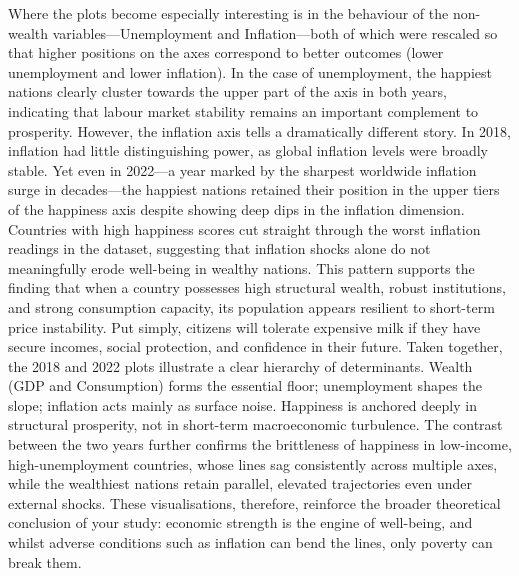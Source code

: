 \documentclass[conference]{IEEEtran}
\begin{document}
Where the plots become especially interesting is in the behaviour of the non-wealth variables—Unemployment and Inflation—both of which were rescaled so that higher positions on the axes correspond to better outcomes (lower unemployment and lower inflation). In the case of unemployment, the happiest nations clearly cluster towards the upper part of the axis in both years, indicating that labour market stability remains an important complement to prosperity. However, the inflation axis tells a dramatically different story. In 2018, inflation had little distinguishing power, as global inflation levels were broadly stable. Yet even in 2022—a year marked by the sharpest worldwide inflation surge in decades—the happiest nations retained their position in the upper tiers of the happiness axis despite showing deep dips in the inflation dimension. Countries with high happiness scores cut straight through the worst inflation readings in the dataset, suggesting that inflation shocks alone do not meaningfully erode well-being in wealthy nations. This pattern supports the finding that when a country possesses high structural wealth, robust institutions, and strong consumption capacity, its population appears resilient to short-term price instability. Put simply, citizens will tolerate expensive milk if they have secure incomes, social protection, and confidence in their future.
Taken together, the 2018 and 2022 plots illustrate a clear hierarchy of determinants. Wealth (GDP and Consumption) forms the essential floor; unemployment shapes the slope; inflation acts mainly as surface noise. Happiness is anchored deeply in structural prosperity, not in short-term macroeconomic turbulence. The contrast between the two years further confirms the brittleness of happiness in low-income, high-unemployment countries, whose lines sag consistently across multiple axes, while the wealthiest nations retain parallel, elevated trajectories even under external shocks. These visualisations, therefore, reinforce the broader theoretical conclusion of your study: economic strength is the engine of well-being, and whilst adverse conditions such as inflation can bend the lines, only poverty can break them.
\end{document}
